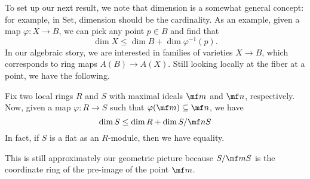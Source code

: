 To set up our next result, we note that dimension is a somewhat general concept: for example, in $\mathrm{Set}$, dimension should be the cardinality. As an example, given a map $\varphi:X\to B$, we can pick any point $p\in B$ and find that
\[\dim X\le\dim B+\dim\varphi^{-1}(p).\] %
In our algebraic story, we are interested in families of varieties $X\to B$, which corresponds to ring maps $A(B)\to A(X)$. Still looking locally at the fiber at a point, we have the following.
\begin{proposition} \label{prop:ranknullity}
	Fix two local rings $R$ and $S$ with maximal ideals $\mf m$ and $\mf n$, respectively. Now, given a map $\varphi:R\to S$ such that $\varphi(\mf m)\subseteq\mf n$, we have
	\[\dim S\le\dim R+\dim S/\mf nS\]
	In fact, if $S$ is a flat as an $R$-module, then we have equality.
\end{proposition}
This is still approximately our geometric picture because $S/\mf mS$ is the coordinate ring of the pre-image of the point $\mf m$.
